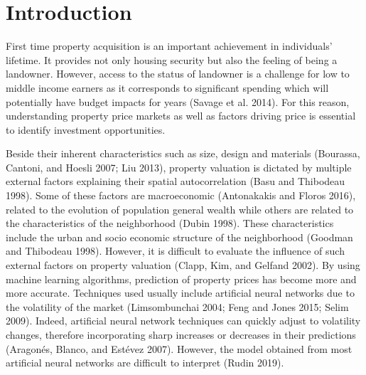 \documentclass[conference,final,]{IEEEtran}
\begin{document}
%
\IEEEpeerreviewmaketitle











\hypertarget{introduction}{%
\section{Introduction}\label{introduction}}

First time property acquisition is an important achievement in individuals' lifetime. It provides not only housing security but also the feeling of being a landowner. However, access to the status of landowner is a challenge for low to middle income earners as it corresponds to significant spending which will potentially have budget impacts for years (Savage et al. 2014). For this reason, understanding property price markets as well as factors driving price is essential to identify investment opportunities.

Beside their inherent characteristics such as size, design and materials (Bourassa, Cantoni, and Hoesli 2007; Liu 2013), property valuation is dictated by multiple external factors explaining their spatial autocorrelation (Basu and Thibodeau 1998). Some of these factors are macroeconomic (Antonakakis and Floros 2016), related to the evolution of population general wealth while others are related to the characteristics of the neighborhood (Dubin 1998). These characteristics include the urban and socio economic structure of the neighborhood (Goodman and Thibodeau 1998). However, it is difficult to evaluate the influence of such external factors on property valuation (Clapp, Kim, and Gelfand 2002). By using machine learning algorithms, prediction of property prices has become more and more accurate. Techniques used usually include artificial neural networks due to the volatility of the market (Limsombunchai 2004; Feng and Jones 2015; Selim 2009). Indeed, artificial neural network techniques can quickly adjust to volatility changes, therefore incorporating sharp increases or decreases in their predictions (Aragonés, Blanco, and Estévez 2007). However, the model obtained from most artificial neural networks are difficult to interpret (Rudin 2019).
\end{document}
